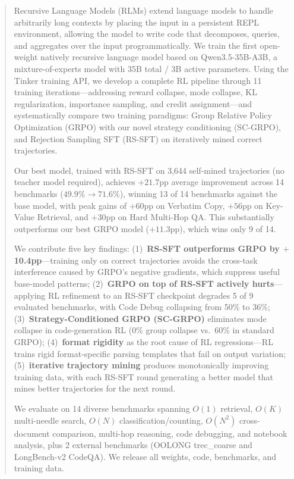 \documentclass{article}
\begin{document}
\begin{abstract}
Recursive Language Models (RLMs) extend language models to handle arbitrarily long contexts by placing the input in a persistent REPL environment, allowing the model to write code that decomposes, queries, and aggregates over the input programmatically. We train the first open-weight natively recursive language model based on Qwen3.5-35B-A3B, a mixture-of-experts model with 35B total / 3B active parameters. Using the Tinker training API, we develop a complete RL pipeline through 11 training iterations---addressing reward collapse, mode collapse, KL regularization, importance sampling, and credit assignment---and systematically compare two training paradigms: Group Relative Policy Optimization (GRPO) with our novel strategy conditioning (SC-GRPO), and Rejection Sampling SFT (RS-SFT) on iteratively mined correct trajectories.

Our best model, trained with RS-SFT on 3,644 self-mined trajectories (no teacher model required), achieves $+21.7$pp average improvement across 14 benchmarks ($49.9\% \to 71.6\%$), winning 13 of 14 benchmarks against the base model, with peak gains of $+60$pp on Verbatim Copy, $+56$pp on Key-Value Retrieval, and $+30$pp on Hard Multi-Hop QA. This substantially outperforms our best GRPO model ($+11.3$pp), which wins only 9 of 14.

We contribute five key findings: (1)~\textbf{RS-SFT outperforms GRPO by $+$10.4pp}---training only on correct trajectories avoids the cross-task interference caused by GRPO's negative gradients, which suppress useful base-model patterns; (2)~\textbf{GRPO on top of RS-SFT actively hurts}---applying RL refinement to an RS-SFT checkpoint degrades 5 of 9 evaluated benchmarks, with Code Debug collapsing from 50\% to 36\%; (3)~\textbf{Strategy-Conditioned GRPO (SC-GRPO)} eliminates mode collapse in code-generation RL (0\% group collapse vs.\ 60\% in standard GRPO); (4)~\textbf{format rigidity} as the root cause of RL regressions---RL trains rigid format-specific parsing templates that fail on output variation; (5)~\textbf{iterative trajectory mining} produces monotonically improving training data, with each RS-SFT round generating a better model that mines better trajectories for the next round.

We evaluate on 14 diverse benchmarks spanning $O(1)$ retrieval, $O(K)$ multi-needle search, $O(N)$ classification/counting, $O(N^2)$ cross-document comparison, multi-hop reasoning, code debugging, and notebook analysis, plus 2 external benchmarks (OOLONG trec\_coarse and LongBench-v2 CodeQA). We release all weights, code, benchmarks, and training data.
\end{abstract}
\end{document}
